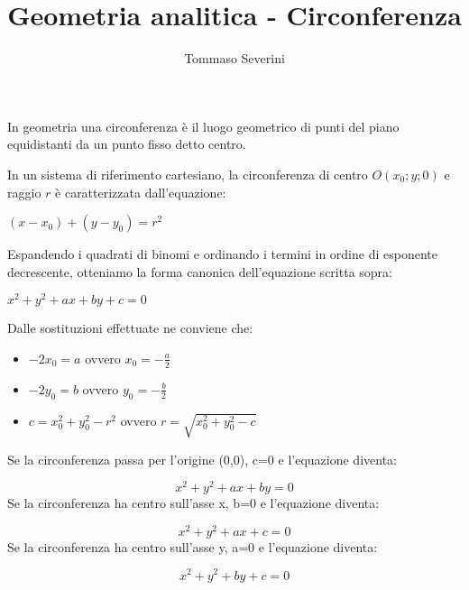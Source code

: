 \documentclass[10pt,a4paper]{article}
\author{Tommaso Severini}
\title{Geometria analitica - Circonferenza}
\begin{document}
	\maketitle
	
	
	In geometria una circonferenza è il luogo geometrico di punti del piano equidistanti da un punto fisso detto centro.
	
	\begin{center}

	\end{center}
	
	In un sistema di riferimento cartesiano, la circonferenza di centro $O(x_0;y;0)$ e raggio $r$ è caratterizzata dall'equazione:
	\begin{definition}
	\centering	$(x-x_0) + (y-y_0) = r^2 $
	\end{definition}
	
	Espandendo i quadrati di binomi e ordinando i termini in ordine di esponente decrescente, otteniamo la forma canonica dell'equazione scritta sopra:
	
	\begin{definition}
		\centering	$x^2 + y^2 + ax + by + c = 0$
		
		Dalle sostituzioni effettuate ne conviene che:
		\begin{itemize}
			\item $-2x_0 = a$ ovvero $ x_0 = -\frac{a}{2}$
			\item $-2y_0 = b$ ovvero $ y_0 = -\frac{b}{2}$
			\item $c = x_0^2 + y_0^2 -r^2$ ovvero $ r = \sqrt{x_0^2 + y_0^2 -c}$
		\end{itemize}
	\end{definition}

Se la circonferenza passa per l'origine (0,0), c=0 e l'equazione diventa:

$$ x^{2}+y^{2}+ax+by=0 $$
Se la circonferenza ha centro sull'asse x, b=0 e l'equazione diventa:

$$ x^{2}+y^{2}+ax+c=0 $$
Se la circonferenza ha centro sull'asse y, a=0 e l'equazione diventa:

$$ x^{2}+y^{2}+by+c=0 $$
	
\end{document}
